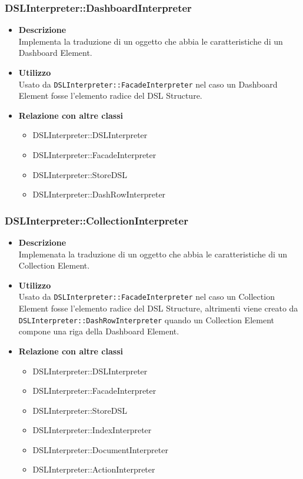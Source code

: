 \subsubsection{DSLInterpreter::DashboardInterpreter}
\begin{itemize}
\item \textbf{Descrizione} \hfill \\
Implementa la traduzione di un oggetto che abbia le caratteristiche di un Dashboard Element.
\item \textbf{Utilizzo} \hfill \\
Usato da \texttt{DSLInterpreter::FacadeInterpreter} nel caso un Dashboard Element fosse l'elemento radice del DSL Structure. 
\item \textbf{Relazione con altre classi}
\begin{itemize}
\item DSLInterpreter::DSLInterpreter
\item DSLInterpreter::FacadeInterpreter
\item DSLInterpreter::StoreDSL
\item DSLInterpreter::DashRowInterpreter
\end{itemize}
\end{itemize}

\subsubsection{DSLInterpreter::CollectionInterpreter}
\begin{itemize}
\item \textbf{Descrizione} \hfill \\
Implemenata la traduzione di un oggetto che abbia le caratteristiche di un Collection Element.
\item \textbf{Utilizzo} \hfill \\
  Usato da \texttt{DSLInterpreter::FacadeInterpreter} \newline nel caso un Collection Element fosse l'elemento radice del DSL Structure, altrimenti viene creato da \texttt{DSLInterpreter::DashRowInterpreter} \newline quando un Collection Element compone una riga della Dashboard Element.
\item \textbf{Relazione con altre classi}
\begin{itemize}
\item DSLInterpreter::DSLInterpreter
\item DSLInterpreter::FacadeInterpreter
\item DSLInterpreter::StoreDSL
\item DSLInterpreter::IndexInterpreter
\item DSLInterpreter::DocumentInterpreter
\item DSLInterpreter::ActionInterpreter
\end{itemize}
\end{itemize}

